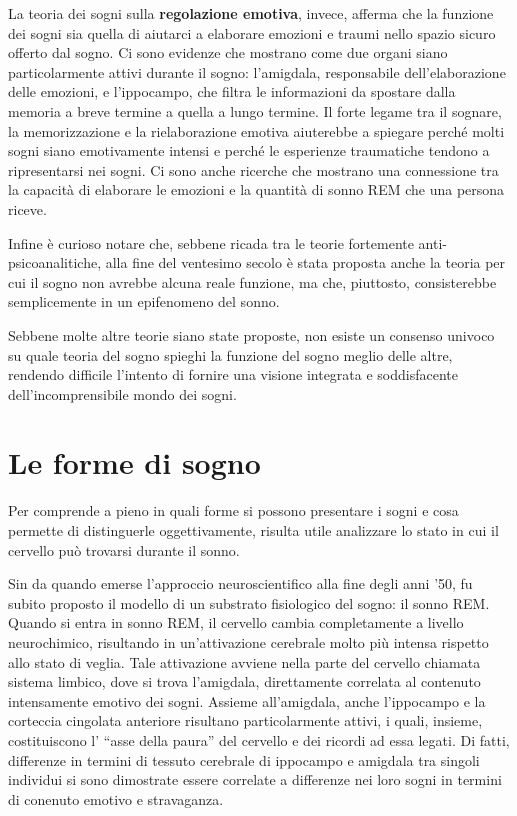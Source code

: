 
La teoria dei sogni sulla \textbf{regolazione emotiva}, invece, afferma che la funzione dei sogni sia quella di aiutarci
a elaborare emozioni e traumi nello spazio sicuro offerto dal sogno.
Ci sono evidenze che mostrano come due organi siano particolarmente attivi durante il sogno: l'amigdala,
responsabile dell'elaborazione delle emozioni, e l'ippocampo, che filtra
le informazioni da spostare dalla memoria a breve termine a quella a lungo termine.
Il forte legame tra il sognare, la memorizzazione e la rielaborazione emotiva aiuterebbe a spiegare perché molti sogni
siano emotivamente intensi e perché le esperienze traumatiche tendono a ripresentarsi nei sogni.
Ci sono anche ricerche che mostrano una connessione tra la capacità di elaborare le emozioni e la quantità di sonno
REM che una persona riceve. \newline

Infine è curioso notare che, sebbene ricada tra le teorie fortemente anti-psicoanalitiche, alla fine del
ventesimo secolo è stata proposta anche la teoria per cui il sogno non avrebbe alcuna reale funzione, ma che,
piuttosto, consisterebbe semplicemente in un epifenomeno del sonno.

Sebbene molte altre teorie siano state proposte, non esiste un consenso univoco su quale teoria del sogno
spieghi la funzione del sogno meglio delle altre, rendendo difficile l'intento di fornire una visione integrata e
soddisfacente dell'incomprensibile mondo dei sogni.

\section{Le forme di sogno}

Per comprende a pieno in quali forme si possono presentare i sogni e cosa permette di distinguerle oggettivamente,
risulta utile analizzare lo stato in cui il cervello può trovarsi durante il sonno.


Sin da quando emerse l'approccio neuroscientifico alla fine degli anni '50, fu subito proposto il modello di un
substrato fisiologico del sogno: il sonno REM.
Quando si entra in sonno REM, il cervello cambia completamente a livello neurochimico, risultando in un'attivazione
cerebrale molto più intensa rispetto allo stato di veglia.
Tale attivazione avviene nella parte del cervello chiamata sistema limbico, dove si trova
l'amigdala, direttamente correlata al contenuto intensamente emotivo dei sogni.
Assieme all'amigdala, anche l'ippocampo e la corteccia cingolata anteriore risultano particolarmente attivi,
i quali, insieme, costituiscono l' ``asse della paura'' del cervello e dei ricordi ad essa legati.
Di fatti, differenze in termini di tessuto cerebrale di ippocampo e amigdala tra singoli individui si sono dimostrate
essere correlate a differenze nei loro sogni in termini di conenuto emotivo e stravaganza.

